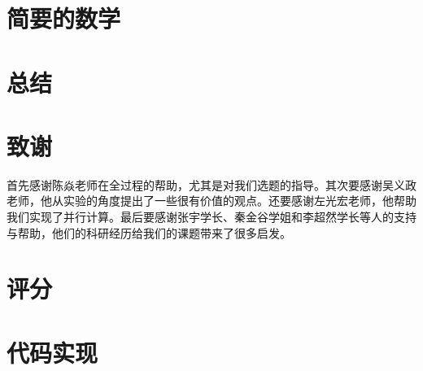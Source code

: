 \documentclass{article}
\begin{document}
	\section{简要的数学}
	\section{总结}
	\section{致谢}
		首先感谢陈焱老师在全过程的帮助，尤其是对我们选题的指导。其次要感谢吴义政老师，他从实验的角度提出了一些很有价值的观点。还要感谢左光宏老师，他帮助我们实现了并行计算。最后要感谢张宇学长、秦金谷学姐和李超然学长等人的支持与帮助，他们的科研经历给我们的课题带来了很多启发。
		
		\flushleft
		
	
	\appendix
	\section{评分}
	\section{代码实现}
%		
		
\end{document}
